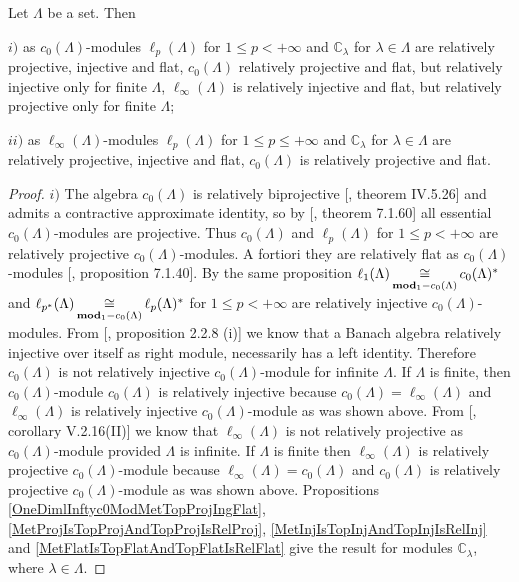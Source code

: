 \begin{proposition}\label{c0AndlInftyModsRelTh} Let $\Lambda$ be a set. Then

$i)$ as $c_0(\Lambda)$-modules $\ell_p(\Lambda)$ for $1\leq p<+\infty$ and $\mathbb{C}_\lambda$ for $\lambda\in\Lambda$ are relatively projective, injective and flat, $c_0(\Lambda)$ relatively projective and flat, but relatively injective only for finite $\Lambda$, $\ell_\infty(\Lambda)$ is relatively injective and flat, but relatively projective only for finite $\Lambda$;

$ii)$ as $\ell_\infty(\Lambda)$-modules $\ell_p(\Lambda)$ for $1\leq p\leq+\infty$ and $\mathbb{C}_\lambda$ for $\lambda\in\Lambda$ are relatively projective, injective and flat, $c_0(\Lambda)$ is relatively projective and flat.
\end{proposition}
\begin{proof} $i)$ The algebra $c_0(\Lambda)$ is relatively biprojective [\cite{HelHomolBanTopAlg}, theorem IV.5.26] and admits a contractive approximate identity, so by [\cite{HelBanLocConvAlg}, theorem 7.1.60] all essential $c_0(\Lambda)$-modules are projective. Thus $c_0(\Lambda)$ and $\ell_p(\Lambda)$ for $1\leq p<+\infty$ are relatively projective $c_0(\Lambda)$-modules. A fortiori they are relatively flat as $c_0(\Lambda)$-modules [\cite{HelBanLocConvAlg}, proposition 7.1.40]. By the same proposition $\ell_1(\Lambda)\mathop{\mathbin{\cong}}\limits_{\mathbf{mod}_1-c_0(\Lambda)}c_0(\Lambda)^*$ and $\ell_{p^*}(\Lambda)\mathop{\mathbin{\cong}}\limits_{\mathbf{mod}_1-c_0(\Lambda)}\ell_p(\Lambda)^*$ for $1\leq p<+\infty$ are relatively injective $c_0(\Lambda)$-modules. From [\cite{RamsHomPropSemgroupAlg}, proposition 2.2.8 (i)] we know that a Banach algebra relatively injective over itself as right module, necessarily has a left identity. Therefore $c_0(\Lambda)$ is not relatively injective $c_0(\Lambda)$-module for infinite $\Lambda$. If $\Lambda$ is finite, then $c_0(\Lambda)$-module $c_0(\Lambda)$ is relatively injective because $c_0(\Lambda)=\ell_\infty(\Lambda)$ and $\ell_\infty(\Lambda)$ is relatively injective $c_0(\Lambda)$-module as was shown above. From [\cite{HelHomolBanTopAlg}, corollary V.2.16(II)] we know that $\ell_\infty(\Lambda)$ is not relatively projective as $c_0(\Lambda)$-module provided $\Lambda$ is infinite. If $\Lambda$ is finite then $\ell_\infty(\Lambda)$ is relatively projective $c_0(\Lambda)$-module because $\ell_\infty(\Lambda)=c_0(\Lambda)$ and $c_0(\Lambda)$ is relatively projective $c_0(\Lambda)$-module as was shown above. Propositions \ref{OneDimlInftyc0ModMetTopProjIngFlat}, \ref{MetProjIsTopProjAndTopProjIsRelProj}, \ref{MetInjIsTopInjAndTopInjIsRelInj} and \ref{MetFlatIsTopFlatAndTopFlatIsRelFlat} give the result for modules $\mathbb{C}_\lambda$, where $\lambda\in\Lambda$.


\end{proof}
